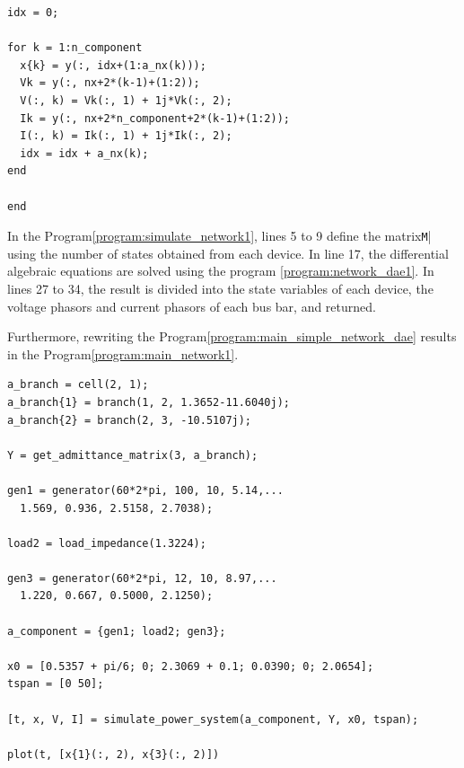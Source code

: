 \documentclass[tombow,dvipdfmx]{corona-a5-1.1}
\begin{document}
\begin{例}
\begin{PROGRAMA}[count,title={simulate\_power\_system.m}]
\begin{verbatim}
idx = 0;

for k = 1:n_component
  x{k} = y(:, idx+(1:a_nx(k)));
  Vk = y(:, nx+2*(k-1)+(1:2));
  V(:, k) = Vk(:, 1) + 1j*Vk(:, 2);
  Ik = y(:, nx+2*n_component+2*(k-1)+(1:2));
  I(:, k) = Ik(:, 1) + 1j*Ik(:, 2);
  idx = idx + a_nx(k);
end

end
\end{verbatim}
\end{PROGRAMA}

In the Program\nobreak\ref{program:simulate_network1}, lines 5 to 9 define the matrix\verb|M|| using the number of states obtained from each device.
In line 17, the differential algebraic equations are solved using the program \nobreak\ref{program:network_dae1}.
In lines 27 to 34, the result is divided into the state variables of each device, the voltage phasors and current phasors of each bus bar, and returned.

Furthermore, rewriting the Program\nobreak\ref{program:main_simple_network_dae} results in the Program\nobreak\ref{program:main_network1}.

\smallskip
\begin{PROGRAMA}[count,title={main\_simulation\_3bus.m}]\label{program:main_network1}
\begin{verbatim}
a_branch = cell(2, 1);
a_branch{1} = branch(1, 2, 1.3652-11.6040j);
a_branch{2} = branch(2, 3, -10.5107j);

Y = get_admittance_matrix(3, a_branch);

gen1 = generator(60*2*pi, 100, 10, 5.14,...
  1.569, 0.936, 2.5158, 2.7038);

load2 = load_impedance(1.3224);

gen3 = generator(60*2*pi, 12, 10, 8.97,...
  1.220, 0.667, 0.5000, 2.1250);

a_component = {gen1; load2; gen3};

x0 = [0.5357 + pi/6; 0; 2.3069 + 0.1; 0.0390; 0; 2.0654];
tspan = [0 50];

[t, x, V, I] = simulate_power_system(a_component, Y, x0, tspan);

plot(t, [x{1}(:, 2), x{3}(:, 2)])
\end{verbatim}
\end{PROGRAMA}


\end{例}
\end{document}

